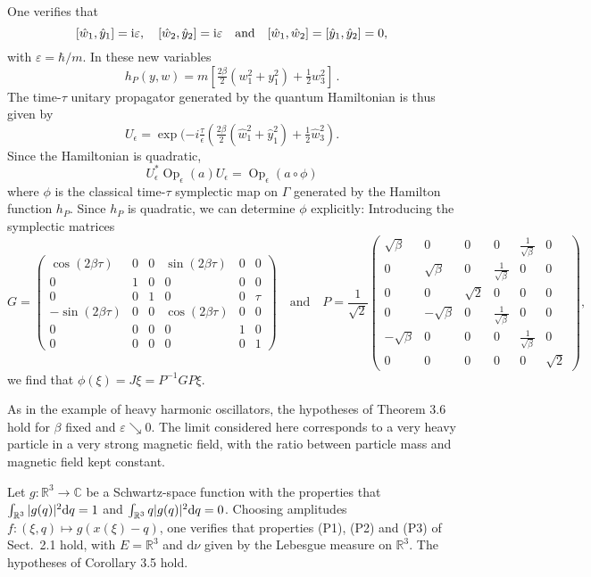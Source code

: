 \documentclass[11pt]{article}
\renewcommand{\d}{{\rm d}}
\renewcommand{\i}{{\rm i}}
\begin{document}
One verifies that
$$[\hat w_1,\hat y_1]=\i\varepsilon,\quad [\hat w_2,\hat y_2]=\i \varepsilon\quad \mbox{and}\quad [\hat w_1,\hat w_2]=[\hat y_1,\hat y_2]=0,$$
with $\varepsilon=\hbar/m$. In these new variables
$$h_P(y,w)=m[\tfrac{2\beta} 2(w_1^2+y_1^2)+\tfrac12w_3^2]\,.$$
The time-$\tau$ unitary propagator generated by the quantum Hamiltonian is thus given by
$$U_\epsilon=\exp(-i \tfrac{\tau}{\epsilon}(\tfrac{2\beta} 2(\hat w_1^2+\hat y_1^2)+\tfrac12\hat w_3^2).$$
Since the Hamiltonian is quadratic, 
$$U_\epsilon^*\operatorname{Op}_{\epsilon}(a)U_\epsilon=\operatorname{Op}_\epsilon(a\circ\phi)$$
where $\phi$ is the classical time-$\tau$ symplectic map on $\Gamma$ generated by the Hamilton function $h_P$. 
Since $h_P$ is quadratic, we can determine $\phi$ explicitly: Introducing the symplectic matrices
$$G=\begin{pmatrix}
	\cos(2\beta\tau)&0&0&\sin(2\beta\tau) & 0&0\\
	0&1&0&0&0&0\\
	0&0&1&0&0&\tau\\
	-\sin(2\beta\tau) &0&0& \cos(2\beta\tau)& 0 &0\\
	0&0&0&0&1&0\\
	0&0&0&0&0&1
\end{pmatrix}\quad\mbox{and}\quad P=\frac1{\sqrt{2}}\begin{pmatrix}
\sqrt{\beta}&0&0&0&\frac1{\sqrt{\beta}}&0\\
0&\sqrt{\beta}&0&\frac{1}{\sqrt{\beta}}&0&0\\
0&0&\sqrt{2}&0&0&0\\
0&-\sqrt{\beta}&0&\frac{1}{\sqrt{\beta}}&0&0\\
-\sqrt{\beta}&0&0&0&\frac1{\sqrt{\beta}}&0\\
0&0&0&0&0&\sqrt{2}
\end{pmatrix},$$
we find that $\phi(\xi)=J\xi= P^{-1}GP\xi$.

As in the example of heavy harmonic oscillators, the hypotheses of Theorem 3.6 hold for $\beta$ fixed and 
$\varepsilon\searrow 0$. The limit considered here corresponds to a very heavy particle in a very strong 
magnetic field, with the ratio between particle mass and magnetic field kept constant.

Let $g:\mathbb R^3\to\mathbb C$ be a Schwartz-space function with the properties that $\int_{\mathbb R^3}|g(q)|^2\d q=1$ 
and $\int_{\mathbb R^3}q |g(q)|^2\d q=0$. Choosing amplitudes $f:(\xi,q)\mapsto g(x(\xi)-q)$, one verifies that properties
 (P1), (P2) and (P3) of Sect.~2.1 hold, with $E=\mathbb R^3$ and $\text{d}\nu$ given by the Lebesgue measure on 
 $\mathbb R^3$. The hypotheses of Corollary 3.5 hold.
\end{document}
